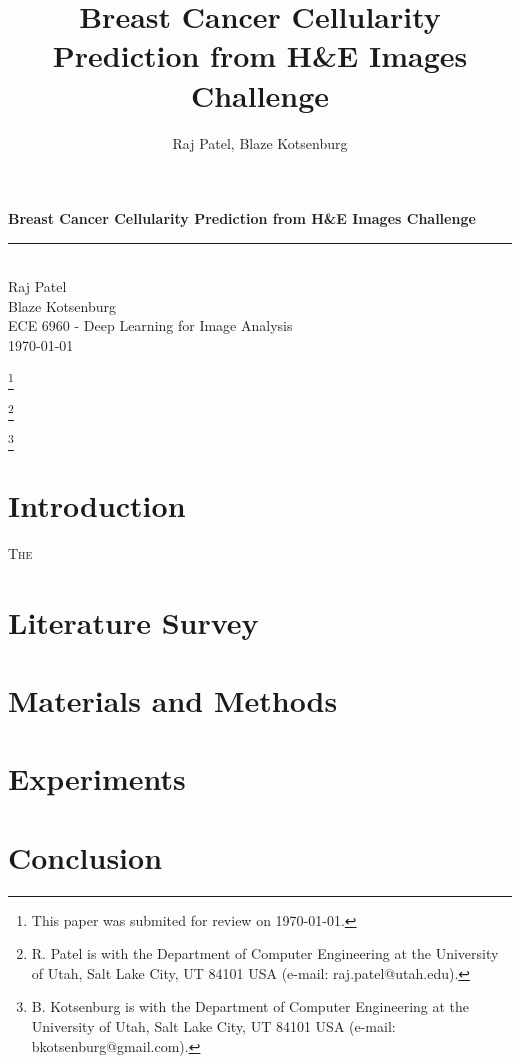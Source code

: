 \documentclass[11pt]{ieeeconf}
\title{Breast Cancer Cellularity Prediction from H\&E Images Challenge}
\author{Raj Patel, Blaze Kotsenburg}
\newcommand\blfootnote[1]{%
  \begingroup
  \renewcommand\thefootnote{}\footnote{#1}%
  \addtocounter{footnote}{-1}%
  \endgroup
}
\begin{document}
\begin{titlepage}
  \newcommand{\HRule}{\rule{\linewidth}{0.5mm}} %
  
  \vspace*{\fill}
  \center %
  
  { \huge \bfseries Breast Cancer Cellularity Prediction from H\&E Images Challenge}\\
  \HRule \\[1cm]

  \large Raj Patel\\
  \large Blaze Kotsenburg\\[1.5cm]

  \normalsize ECE 6960 - Deep Learning for Image Analysis\\
  \normalsize \today\\[4cm]
  
  \vspace*{\fill}
\end{titlepage}

\maketitle
\begin{abstract}

\end{abstract}

\begin{keywords}
  
\end{keywords}

\blfootnote{This paper was submited for review on \today.}
\blfootnote{R. Patel is with the Department of Computer Engineering at the University of Utah, Salt Lake City, UT 84101 USA (e-mail: raj.patel@utah.edu).}
\blfootnote{B. Kotsenburg is with the Department of Computer Engineering at the University of Utah, Salt Lake City, UT 84101 USA (e-mail: bkotsenburg@gmail.com).}

\section{Introduction}
\lettrine{T}{he}

\section{Literature Survey}


\section{Materials and Methods}


\section{Experiments}


\section{Conclusion}


\nocite{*}


\end{document}
